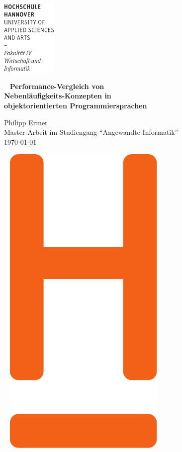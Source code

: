 \documentclass[fontsize=12pt,paper=a4,twoside=semi,parskip=half-,headsepline,headinclude]{scrreprt}
\begin{document}
  \thispagestyle{empty} %
\includegraphics[width=0.2\textwidth]{hsh_icons/Wortmarke_WI_schwarz}

   {  ~ \sffamily
  \vfill
  {\Huge\bfseries Performance-Vergleich von \\Nebenläufigkeits-Konzepten in \\objektorientierten Programmiersprachen}
  \bigskip

  {\Large 
  Philipp Ermer \\[2ex]
 Master-Arbeit im Studiengang "`Angewandte Informatik"' 
 \\[5ex]
   \today } 
}
 \vfill
  
  ~ \hfill
  \includegraphics[height=0.3\paperheight]{hsh_icons/H_WI_Pantone1665} 
\end{document}
